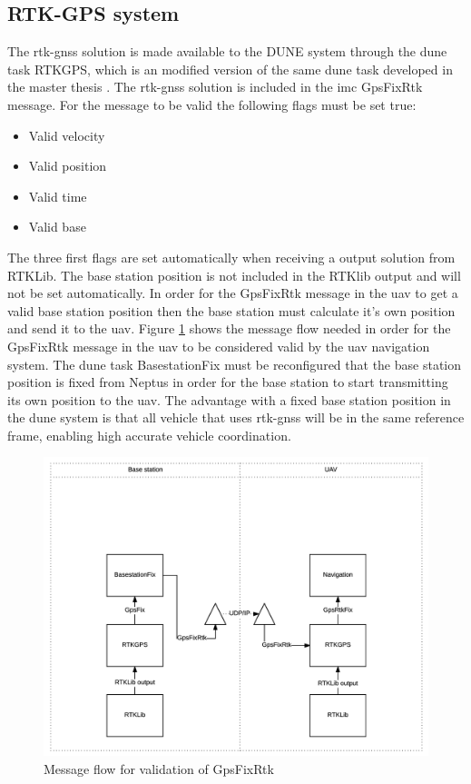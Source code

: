 \subsection{RTK-GPS system}\label{ss:RTK-GPS system}
The \gls{rtk-gnss} solution is made available to the DUNE system through the \gls{dune} task RTKGPS, which is an modified version of the same \gls{dune} task developed in the master thesis \citep{Spockeli}. The \gls{rtk-gnss} solution is included in the \gls{imc} GpsFixRtk message. For the message to be valid the following flags must be set true:
\begin{table}[H]
\begin{itemize}[noitemsep]
\item Valid velocity
\item Valid position
\item Valid time
\item Valid base
\end{itemize}
\end{table}
The three first flags are set automatically when receiving a output solution from RTKLib. The base station position is not included in the RTKlib output and will not be set automatically. In order for the GpsFixRtk message in the \gls{uav} to get a valid base station position then the base station must calculate it's own position and send it to the \gls{uav}. Figure \ref{Fig:ValidationGpsFixRtk} shows the message flow needed in order for the GpsFixRtk message in the \gls{uav} to be considered valid by the \gls{uav} navigation system. The \gls{dune} task BasestationFix must be reconfigured that the base station position is fixed from Neptus in order for the base station to start transmitting its own position to the \gls{uav}. The advantage with a fixed base station position in the \gls{dune} system is that all vehicle that uses \gls{rtk-gnss} will be in the same reference frame, enabling high accurate vehicle coordination.
\begin{figure}[H]
\centering
\includegraphics[scale=0.7]{figs/ValidationGpsFixRtk.png}
\caption{Message flow for validation of GpsFixRtk}
\label{Fig:ValidationGpsFixRtk}
\end{figure}
